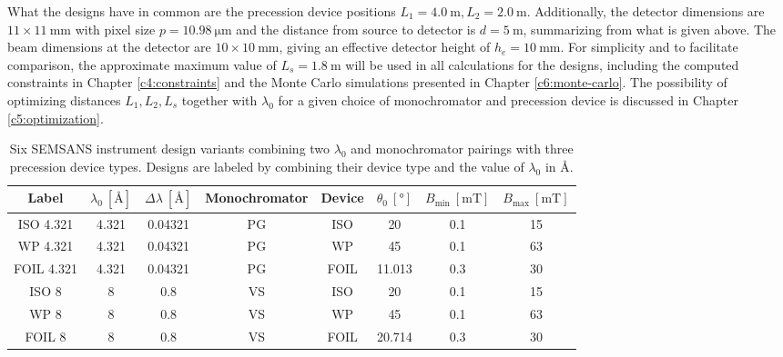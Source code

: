 What the designs have in common are the precession device positions $L_1 = \SI{4.0}{\meter}, L_2 = \SI{2.0}{\meter}$. Additionally, the detector dimensions are $11\times 11~\unit{\milli\meter}$ with pixel size $p = \SI{10.98}{\micro\meter}$ and the distance from source to detector is $d = \SI{5}{\meter}$, summarizing from what is given above. The beam dimensions at the detector are $10\times 10~\unit{\milli\meter}$, giving an effective detector height of $h_e =\SI{10}{\milli\meter}$. For simplicity and to facilitate comparison, the approximate maximum value of $L_s = \SI{1.8}{\meter}$ will be used in all calculations for the designs, including the computed constraints in Chapter \ref{c4:constraints} and the Monte Carlo simulations presented in Chapter \ref{c6:monte-carlo}. The possibility of optimizing distances $L_1, L_2, L_s$ together with $\lambda_0$ for a given choice of monochromator and precession device is discussed in Chapter \ref{c5:optimization}.  

\begin{table}[h!]
	\centering
	\begin{tabular}{ c|c c c | c c c c }
		\toprule
		Label & $\lambda_0~[\unit{\angstrom}]$ & $\Delta\lambda~[\unit{\angstrom}]$ & Monochromator & Device & $\theta_0~[\unit{\degree}]$ & $B_{\text{min}}~[\unit{\milli\tesla}]$ & $B_{\text{max}} ~[\unit{\milli\tesla}]$ \\
		\midrule
		ISO 4.321 & \num{4.321} & \num{0.04321} & PG & ISO & \num{20} & \num{0.1} & \num{15} \\
		WP 4.321 & \num{4.321} & \num{0.04321} & PG & WP & \num{45} & \num{0.1} & \num{63} \\
		FOIL 4.321 & \num{4.321} & \num{0.04321} & PG & FOIL & \num{11.013} & \num{0.3} & \num{30} \\
		ISO 8 & \num{8} & \num{0.8} & VS & ISO & \num{20} & \num{0.1} & \num{15} \\
		WP 8 & \num{8} & \num{0.8} & VS & WP & \num{45} & \num{0.1} & \num{63} \\
		FOIL 8 & \num{8} & \num{0.8} & VS & FOIL & \num{20.714} & \num{0.3} & \num{30} \\
		
		\bottomrule
	\end{tabular}
	\caption{Six SEMSANS instrument design variants combining two $\lambda_0$ and monochromator pairings with three precession device types. Designs are labeled by combining their device type and the value of $\lambda_0$ in Å.}
	\label{tab:design-variants}
\end{table}
